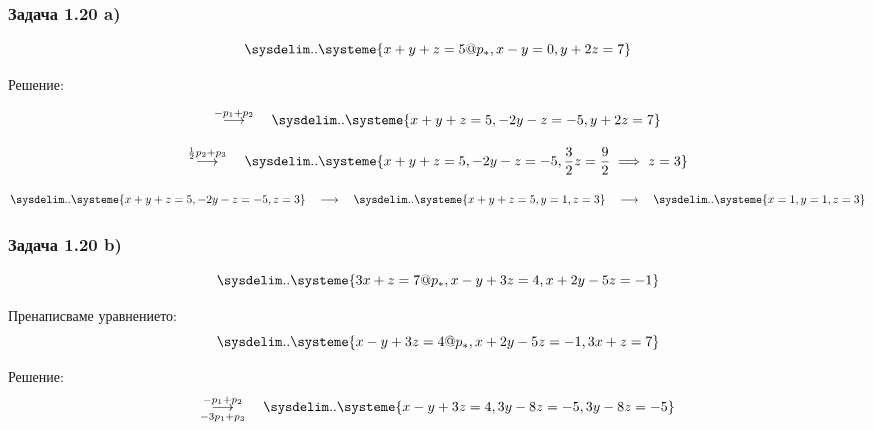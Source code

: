 \documentclass{subfiles}
\begin{document}
\subsubsection{Задача 1.20 a)}

\begin{equation*}
    \sysdelim..\systeme{
        x + y + z = 5@p_{*},
        x - y = 0,
        y + 2z = 7
    }
\end{equation*}

\noindent Решение:

\begin{equation*}
    \overset{-p_{1} + p_{2}}{\longrightarrow}
    \quad
    \sysdelim..\systeme{
        x + y + z = 5,
        -2y - z = -5,
        y + 2z = 7
    }
\end{equation*}

\begin{equation*}
    \overset{\frac{1}{2}p_{2} + p_{3}}{\longrightarrow}
    \quad
    \sysdelim..\systeme{
        x + y + z = 5,
        -2y - z = -5,
        \frac{3}{2}z = \frac{9}{2} \implies z = 3
    }
\end{equation*}

\begin{equation*}
    \sysdelim..\systeme{
        x + y + z = 5,
        -2y - z = -5,
        z = 3
    }
    \quad
    \longrightarrow
    \quad
    \sysdelim..\systeme{
        x + y + z = 5,
        y = 1,
        z = 3
    }
    \quad
    \longrightarrow
    \quad
    \sysdelim..\systeme{
        x = 1,
        y = 1,
        z = 3
    }
\end{equation*}

\subsubsection{Задача 1.20 b)}

\begin{equation*}
    \sysdelim..\systeme{
        3x + z = 7@p_{*},
        x - y + 3z = 4,
        x + 2y - 5z = -1
    }
\end{equation*}

\noindent Пренаписваме уравнението:
\begin{equation*}
    \sysdelim..\systeme{
        x - y + 3z = 4@p_{*},
        x + 2y - 5z = -1,
        3x + z = 7
    }
\end{equation*}

\noindent Решение:
\begin{equation*}
    \overset{-p_{1} + p_{2}}{\underset{-3p_{1} + p_{3}}{\longrightarrow}}
    \quad
    \sysdelim..\systeme{
        x - y + 3z = 4,
        3y - 8z = -5,
        3y - 8z = -5
    }
\end{equation*}
\end{document}

